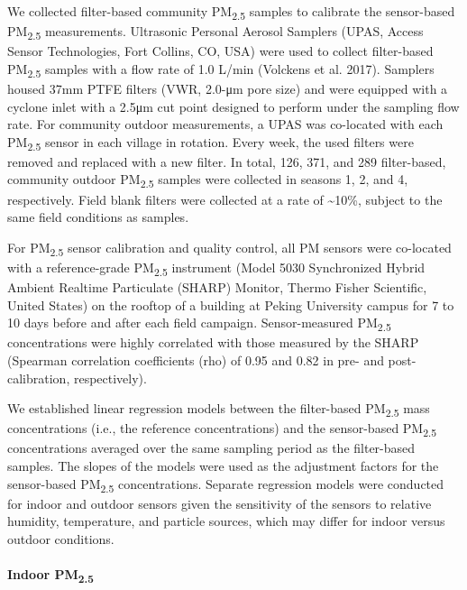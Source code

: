 \documentclass[
  letterpaper,
  DIV=11,
  numbers=noendperiod]{scrartcl}
\let\oldparagraph\paragraph
\renewcommand{\paragraph}[1]{\oldparagraph{#1}\mbox{}}
\begin{document}
We collected filter-based community PM\textsubscript{2.5} samples to
calibrate the sensor-based PM\textsubscript{2.5} measurements.
Ultrasonic Personal Aerosol Samplers (UPAS, Access Sensor Technologies,
Fort Collins, CO, USA) were used to collect filter-based
PM\textsubscript{2.5} samples with a flow rate of 1.0 L/min (Volckens et
al. 2017). Samplers housed 37mm PTFE filters (VWR, 2.0-μm pore size) and
were equipped with a cyclone inlet with a 2.5μm cut point designed to
perform under the sampling flow rate. For community outdoor
measurements, a UPAS was co-located with each PM\textsubscript{2.5}
sensor in each village in rotation. Every week, the used filters were
removed and replaced with a new filter. In total, 126, 371, and 289
filter-based, community outdoor PM\textsubscript{2.5} samples were
collected in seasons 1, 2, and 4, respectively. Field blank filters were
collected at a rate of \textasciitilde10\%, subject to the same field
conditions as samples.

For PM\textsubscript{2.5} sensor calibration and quality control, all PM
sensors were co-located with a reference-grade PM\textsubscript{2.5}
instrument (Model 5030 Synchronized Hybrid Ambient Realtime Particulate
(SHARP) Monitor, Thermo Fisher Scientific, United States) on the rooftop
of a building at Peking University campus for 7 to 10 days before and
after each field campaign. Sensor-measured PM\textsubscript{2.5}
concentrations were highly correlated with those measured by the SHARP
(Spearman correlation coefficients (rho) of 0.95 and 0.82 in pre- and
post-calibration, respectively).

We established linear regression models between the filter-based
PM\textsubscript{2.5} mass concentrations (i.e., the reference
concentrations) and the sensor-based PM\textsubscript{2.5}
concentrations averaged over the same sampling period as the
filter-based samples. The slopes of the models were used as the
adjustment factors for the sensor-based PM\textsubscript{2.5}
concentrations. Separate regression models were conducted for indoor and
outdoor sensors given the sensitivity of the sensors to relative
humidity, temperature, and particle sources, which may differ for indoor
versus outdoor conditions.

\hypertarget{indoor-pm2.5}{%
\paragraph{\texorpdfstring{Indoor
PM\textsubscript{2.5}}{Indoor PM2.5}}\label{indoor-pm2.5}}
\end{document}
